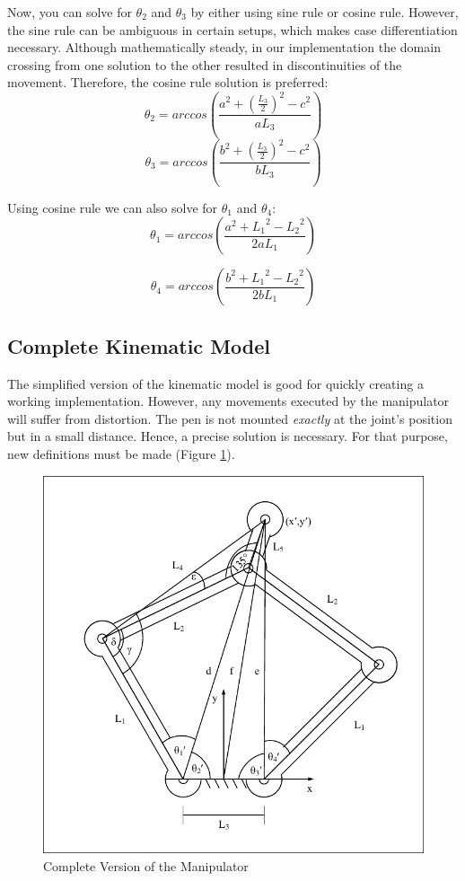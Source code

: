 \documentclass{sig-alternate-05-2015}
\begin{document}
Now, you can solve for $\theta_2$ and $\theta_3$ by either using sine rule or cosine rule. However, the sine rule can be ambiguous in certain setups, which makes case differentiation necessary. Although mathematically steady, in our implementation the domain crossing from one solution to the other resulted in discontinuities of the movement. Therefore, the cosine rule solution is preferred:
\begin{equation}
\theta_2 = arccos\left(  \frac{a^2 + (\frac{L_3}{2})^2 - c^2}{aL_3} \right)
\label{eqn:theta2}
\end{equation}
\begin{equation}
\theta_3 = arccos\left(  \frac{b^2 + (\frac{L_3}{2})^2 - c^2}{bL_3} \right)
\label{eqn:theta3}
\end{equation}


Using cosine rule we can also solve for $\theta_1$ and $\theta_4$:
\begin{equation}
\theta_1 = arccos\left(  \frac{a^2 + {L_1}^2 - {L_2}^2}{2aL_1} \right)
\label{eqn:theta1}
\end{equation}

\begin{equation}
\theta_4 = arccos\left(  \frac{b^2 + {L_1}^2 - {L_2}^2}{2bL_1} \right)
\label{eqn:theta4}
\end{equation}

\subsection{Complete Kinematic Model}
The simplified version of the kinematic model is good for quickly creating a working implementation. However, any movements executed by the manipulator will suffer from distortion. The pen is not mounted \emph{exactly} at the joint's position but in a small distance. Hence, a precise solution is necessary. For that purpose, new definitions must be made (Figure \ref{fig:model2}).
\begin{figure}[!h]
	\label{fig:model2}
	\centering
	\includegraphics[width=.42\textwidth]{LinkDiagramComplicated_try.pdf}
	\caption{Complete Version of the Manipulator}
\end{figure}
\end{document}
